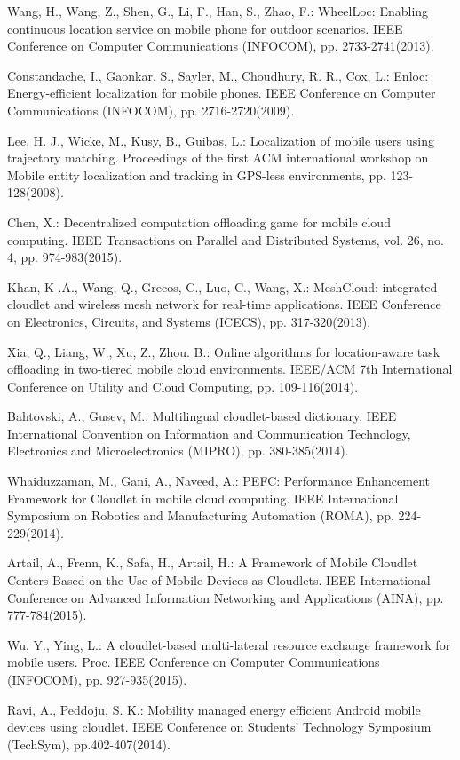 \documentclass{llncs}
\begin{document}
\begin{thebibliography}{99}
Wang, H., Wang, Z., Shen, G., Li, F., Han, S., Zhao, F.:
WheelLoc: Enabling continuous location service on mobile phone for outdoor scenarios.
IEEE Conference on Computer Communications (INFOCOM), pp. 2733-2741(2013).

Constandache, I., Gaonkar, S., Sayler, M., Choudhury, R. R., Cox, L.:
Enloc: Energy-efficient localization for mobile phones.
IEEE Conference on Computer Communications (INFOCOM), pp. 2716-2720(2009).

Lee, H. J., Wicke, M., Kusy, B., Guibas, L.:
Localization of mobile users using trajectory matching.
Proceedings of the first ACM international workshop on Mobile entity localization and tracking in GPS-less environments, pp. 123-128(2008).

Chen, X.:
Decentralized computation offloading game for mobile cloud computing.
IEEE Transactions on Parallel and Distributed Systems, vol. 26, no. 4, pp. 974-983(2015).

Khan, K .A., Wang, Q., Grecos, C., Luo, C., Wang, X.:
MeshCloud: integrated cloudlet and wireless mesh network for real-time applications.
IEEE Conference on Electronics, Circuits, and Systems (ICECS), pp. 317-320(2013).

Xia, Q., Liang, W., Xu, Z., Zhou. B.:
Online algorithms for location-aware task offloading in two-tiered mobile cloud environments.
IEEE/ACM 7th International Conference on Utility and Cloud Computing, pp. 109-116(2014).

Bahtovski, A., Gusev, M.:
Multilingual cloudlet-based dictionary.
IEEE International Convention on Information and Communication Technology, Electronics and Microelectronics (MIPRO), pp. 380-385(2014).

Whaiduzzaman, M., Gani, A., Naveed, A.:
PEFC: Performance Enhancement Framework for Cloudlet in mobile cloud computing.
IEEE International Symposium on Robotics and Manufacturing Automation (ROMA), pp. 224-229(2014).

Artail, A., Frenn, K., Safa, H., Artail, H.:
A Framework of Mobile Cloudlet Centers Based on the Use of Mobile Devices as Cloudlets.
IEEE International Conference on Advanced Information Networking and Applications (AINA), pp. 777-784(2015).

Wu, Y., Ying, L.:
A cloudlet-based multi-lateral resource exchange framework for mobile users.
Proc. IEEE Conference on Computer Communications (INFOCOM), pp. 927-935(2015).

Ravi, A., Peddoju, S. K.:
Mobility managed energy efficient Android mobile devices using cloudlet.
IEEE Conference on Students' Technology Symposium (TechSym), pp.402-407(2014).

\end{thebibliography}
\end{document}
